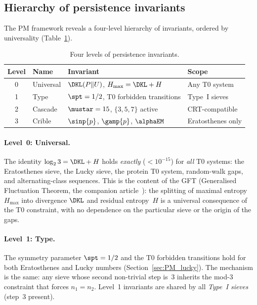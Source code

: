 \documentclass[12pt,a4paper]{article}
\begin{document}
\subsection{Hierarchy of persistence invariants}
\label{sec:PM_hierarchy}

The PM framework reveals a four-level hierarchy of invariants,
ordered by universality (Table~\ref{tab:PM_hierarchy}).

\begin{table}[htbp]
\centering
\caption{Four levels of persistence invariants.}
\label{tab:PM_hierarchy}
\begin{tabular}{clll}
\toprule
\textbf{Level} & \textbf{Name} & \textbf{Invariant} & \textbf{Scope} \\
\midrule
0 & Universal & $\DKL(P \| U)$, $H_{\max} = \DKL + H$ & Any T0 system \\
1 & Type & $\spt = 1/2$, T0 forbidden transitions & Type~I sieves \\
2 & Cascade & $\mustar = 15$, $\{3,5,7\}$ active & CRT-compatible \\
3 & Crible & $\sinp{p}$, $\gamp{p}$, $\alphaEM$ & Eratosthenes only \\
\bottomrule
\end{tabular}
\end{table}

\paragraph{Level~0: Universal.}
The identity $\log_2 3 = \DKL + H$ holds \emph{exactly}
($< 10^{-15}$) for \emph{all} T0 systems: the Eratosthenes sieve,
the Lucky sieve, the protein T0 system, random-walk gaps, and
alternating-class sequences.  This is the content of the GFT
(Generalised Fluctuation Theorem, the companion article~\cite{companion_M1}): the splitting
of maximal entropy $H_{\max}$ into divergence $\DKL$ and residual
entropy~$H$ is a universal consequence of the T0 constraint, with
no dependence on the particular sieve or the origin of the gaps.

\paragraph{Level~1: Type.}
The symmetry parameter $\spt = 1/2$ and the T0 forbidden transitions
hold for both Eratosthenes and Lucky numbers
(Section~\ref{sec:PM_lucky}).  The mechanism is the same: any sieve
whose second non-trivial step is~3 inherits the mod-3 constraint
that forces $n_1 = n_2$.  Level~1 invariants are shared by all
\emph{Type~I sieves} (step~3 present).
\end{document}
